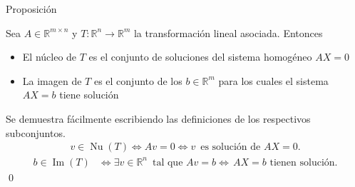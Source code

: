 \documentclass[handout]{beamer} %
\newcommand{\im}{\operatorname{Im}}
\renewcommand\nu{\operatorname{Nu}}
\newcommand{\R}{\mathbb R}
\newcommand{\K}{\mathbb K}
\begin{document}
\begin{frame}
\end{frame}


\begin{frame}



\begin{block}{Proposición}

Sea $A\in\R^{m\times n}$ y $T:\R^n\longrightarrow\R^m$ la transformación lineal asociada. Entonces
\begin{itemize}\pause
 \item El núcleo de $T$ es el conjunto de soluciones del sistema homogéneo $AX=0$
 \pause
 \item La imagen de $T$ es el conjunto de los $b\in\R^m$ para los cuales el sistema $AX=b$ tiene solución
\end{itemize}
\end{block}\pause
\begin{demostracion}\pause
    
\end{demostracion}
Se demuestra fácilmente escribiendo las definiciones de los respectivos subconjuntos.
\begin{align*}
v\in\nu(T)\Leftrightarrow Av=0\Leftrightarrow v\,\mbox{ es solución de $AX=0$.}
\end{align*}
\begin{align*}
b\in\im(T)&\Leftrightarrow\exists v\in\R^n\,\mbox{ tal que } Av=b 
\Leftrightarrow\,\mbox{$AX=b$ tienen solución}.
\end{align*}
\qed


\end{frame}
\end{document}
